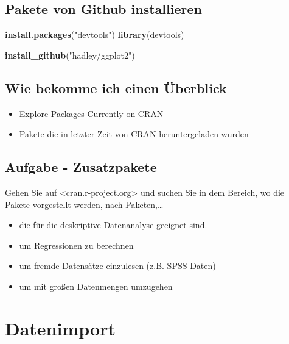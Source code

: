 \documentclass[]{article}
\newenvironment{Shaded}{\begin{snugshade}}{\end{snugshade}}
\newcommand{\KeywordTok}[1]{\textcolor[rgb]{0.13,0.29,0.53}{\textbf{{#1}}}}
\newcommand{\StringTok}[1]{\textcolor[rgb]{0.31,0.60,0.02}{{#1}}}
\newcommand{\NormalTok}[1]{{#1}}
\providecommand{\tightlist}{%
  \setlength{\itemsep}{0pt}\setlength{\parskip}{0pt}}
\begin{document}
\subsection{Pakete von Github
installieren}\label{pakete-von-github-installieren}

\begin{Shaded}
\begin{Highlighting}[]
\KeywordTok{install.packages}\NormalTok{(}\StringTok{"devtools"}\NormalTok{)}
\KeywordTok{library}\NormalTok{(devtools)}

\KeywordTok{install_github}\NormalTok{(}\StringTok{"hadley/ggplot2"}\NormalTok{)}
\end{Highlighting}
\end{Shaded}

\subsection{Wie bekomme ich einen
Überblick}\label{wie-bekomme-ich-einen-uberblick}

\begin{itemize}
\item
  \href{https://mran.microsoft.com/packages/}{Explore Packages Currently
  on CRAN}
\item
  \href{https://gallery.shinyapps.io/cran-gauge/}{Pakete die in letzter
  Zeit von CRAN heruntergeladen wurden}
\end{itemize}

\subsection{Aufgabe - Zusatzpakete}\label{aufgabe---zusatzpakete}

Gehen Sie auf \textless{}cran.r-project.org\textgreater{} und suchen Sie
in dem Bereich, wo die Pakete vorgestellt werden, nach Paketen,\ldots{}

\begin{itemize}
\tightlist
\item
  die für die deskriptive Datenanalyse geeignet sind.
\item
  um Regressionen zu berechnen
\item
  um fremde Datensätze einzulesen (z.B. SPSS-Daten)
\item
  um mit großen Datenmengen umzugehen
\end{itemize}

\section{Datenimport}\label{datenimport}
\end{document}
